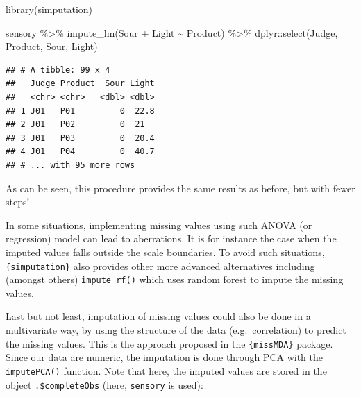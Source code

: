 \documentclass[
]{krantz}
\makeatletter
\newenvironment{Shaded}{\begin{snugshade}}{\end{snugshade}}
\newcommand{\AttributeTok}[1]{\textcolor[rgb]{0.61,0.61,0.61}{#1}}
\newcommand{\DecValTok}[1]{\textcolor[rgb]{0.06,0.06,0.06}{#1}}
\newcommand{\FunctionTok}[1]{\textcolor[rgb]{0,0,0}{#1}}
\newcommand{\NormalTok}[1]{#1}
\newcommand{\SpecialCharTok}[1]{\textcolor[rgb]{0,0,0}{#1}}
\newcommand{\StringTok}[1]{\textcolor[rgb]{0.5,0.5,0.5}{#1}}
\newenvironment{kframe}{%
\medskip{}
\setlength{\fboxsep}{.8em}
 \def\at@end@of@kframe{}%
 \ifinner\ifhmode%
  \def\at@end@of@kframe{\end{minipage}}%
  \begin{minipage}{\columnwidth}%
 \fi\fi%
 \def\FrameCommand##1{\hskip\@totalleftmargin \hskip-\fboxsep
 \colorbox{shadecolor}{##1}\hskip-\fboxsep
     \hskip-\linewidth \hskip-\@totalleftmargin \hskip\columnwidth}%
 \MakeFramed {\advance\hsize-\width
   \@totalleftmargin\z@ \linewidth\hsize
   \@setminipage}}%
 {\par\unskip\endMakeFramed%
 \at@end@of@kframe}
\renewenvironment{Shaded}{\begin{kframe}}{\end{kframe}}
\makeatother
\begin{document}
\begin{Shaded}
\begin{Highlighting}[]
\FunctionTok{library}\NormalTok{(simputation)}

\NormalTok{sensory }\SpecialCharTok{\%\textgreater{}\%} 
  \FunctionTok{impute\_lm}\NormalTok{(Sour }\SpecialCharTok{+}\NormalTok{ Light }\SpecialCharTok{\textasciitilde{}}\NormalTok{ Product) }\SpecialCharTok{\%\textgreater{}\%} 
\NormalTok{  dplyr}\SpecialCharTok{::}\FunctionTok{select}\NormalTok{(Judge, Product, Sour, Light)}
\end{Highlighting}
\end{Shaded}

\begin{verbatim}
## # A tibble: 99 x 4
##   Judge Product  Sour Light
##   <chr> <chr>   <dbl> <dbl>
## 1 J01   P01         0  22.8
## 2 J01   P02         0  21  
## 3 J01   P03         0  20.4
## 4 J01   P04         0  40.7
## # ... with 95 more rows
\end{verbatim}

As can be seen, this procedure provides the same results as before, but with fewer steps!

In some situations, implementing missing values using such ANOVA (or regression) model can lead to aberrations. It is for instance the case when the imputed values falls outside the scale boundaries. To avoid such situations, \texttt{\{simputation\}} also provides other more advanced alternatives including (amongst others) \texttt{impute\_rf()} which uses random forest to impute the missing values.

Last but not least, imputation of missing values could also be done in a multivariate way, by using the structure of the data (e.g.~correlation) to predict the missing values. This is the approach proposed in the \texttt{\{missMDA\}} package. Since our data are numeric, the imputation is done through PCA with the \texttt{imputePCA()} function. Note that here, the imputed values are stored in the object \texttt{.\$completeObs} (here, \texttt{sensory} is used):

\begin{Shaded}
\end{Shaded}
\end{document}
